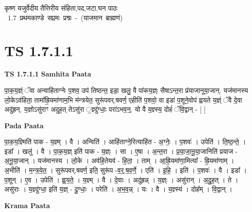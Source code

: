 \documentclass[17pt]{extarticle}
\begin{document}
\begin{titlepage}
    \begin{center}
 
\begin{sanskrit}
    { \Huge
    कृष्ण यजुर्वेदीय तैत्तिरीय संहिता,पद,जटा,घन पाठः 
    }
    \\
    \vspace{2.5cm}
    \mbox{ \Huge
    1.7     प्रथमकाण्डे सप्तमः प्रश्नः - (याजमान ब्राह्मणं)   }
\end{sanskrit}
\end{center}

\end{titlepage}
\tableofcontents
\pagebreak

\section*{ TS 1.7.1.1 }

\textbf{TS 1.7.1.1 } \newline
\textbf{Samhita Paata} \newline

पा॒क॒य॒ज्ञ्ं ॅवा अन्वाहि॑ताग्नेः प॒शव॒ उप॑ तिष्ठन्त॒ इडा॒ खलु॒ वै पा॑कय॒ज्ञ्ः सैषाऽन्त॒रा प्र॑याजानूया॒जान्. यज॑मानस्य लो॒केऽव॑हिता॒ तामा᳚ह्रि॒यमा॑णाम॒भि म॑न्त्रयेत॒ सुरू॑पवर्.षवर्ण॒ एहीति॑ प॒शवो॒ वा इडा॑ प॒शूने॒वोप॑ ह्वयते य॒ज्ञ्ं ॅवै दे॒वा अदु॑ह्रन्. य॒ज्ञोऽसु॑राꣳ अदुह॒त् तेऽसु॑रा ॒ज्ञ्दु॑ग्धाः॒ परा॑ऽभव॒न्॒. यो वै य॒ज्ञ्स्य॒ दोहं॑ ॅवि॒द्वान् - [ ] \newline

\textbf{Pada Paata} \newline

पा॒क॒य॒ज्ञ्मिति॑ पाक - य॒ज्ञ्म् । वै । अन्विति॑ । आहि॑ताग्ने॒रित्याहि॑त - अ॒ग्नेः॒ । प॒शवः॑ । उपेति॑ । ति॒ष्ठ॒न्ते॒ । इडा᳚ । खलु॑ । वै । पा॒क॒य॒ज्ञ् इति॑ पाक - य॒ज्ञ्ः । सा । ए॒षा । अ॒न्त॒रा । प्र॒या॒जा॒नू॒या॒जानिति॑ प्रयाज - अ॒नू॒या॒जान् । यज॑मानस्य । लो॒के । अव॑हि॒तेयव॑ - हि॒ता॒ । ताम् । आ॒ह्रि॒यमा॑णा॒मित्या᳚ - ह्रि॒यमा॑णाम् । अ॒भीति॑ । म॒न्त्र॒ये॒त॒ । सुरू॑पवर्.षवर्ण॒ इति॒ सुरू॑प -व॒र्॒.ष॒व॒र्णे॒ । एति॑ । इ॒हि॒ । इति॑ । प॒शवः॑ । वै । इडा᳚ । प॒शून् । ए॒व । उपेति॑ । ह्व॒य॒ते॒ । य॒ज्ञ्म् । वै । दे॒वाः । अदु॑ह्रन्न् । य॒ज्ञ्ः । असु॑रान् । अ॒दु॒ह॒त् । ते । असु॑राः । य॒ज्ञ्दु॑ग्धा॒ इति॑ य॒ज्ञ् - दु॒ग्धाः॒ । परेति॑ । अ॒भ॒व॒न्न् । यः । वै । य॒ज्ञ्स्य॑ । दोह᳚म् । वि॒द्वान् ।  \newline


\textbf{Krama Paata} \newline
\end{document}

